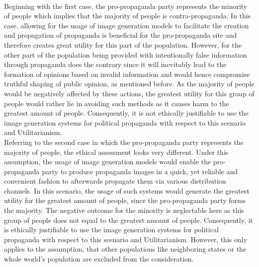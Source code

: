 \documentclass[10pt,twocolumn,twoside]{osajnl}
\begin{document}
\\
Beginning with the first case, the pro-propaganda party represents the minority of people which implies that the majority of people is contra-propaganda. In this case,
allowing for the usage of image generation models to facilitate the creation and propagation of propaganda is beneficial for the pro-propaganda site and therefore creates great utility for this part of the population.
However, for the other part of the population being provided with intentionally false information through propaganda does the contrary since it will inevitably lead to the formation of opinions based on 
invalid information and would hence compromise truthful shaping of public opinion, as mentioned before. 
As the majority of people would be negatively affected by these actions, the greatest utility for this group of people would rather lie in avoiding such methods as it causes harm to the greatest amount of people. 
Consequently, it is not ethically justifiable to use the image generation systems for political propaganda with respect to this scenario and Utilitarianism.
\\
Referring to the second case in which the pro-propaganda party represents the majority of people, the ethical assessment looks very different.
Under this assumption, the usage of image generation models would enable the pro-propaganda party to produce propaganda images in a quick, yet reliable and convenient fashion to afterwards 
propagate them via various distribution channels. In this scenario, the usage of such systems would generate the greatest utility for the greatest amount of people, since the pro-propaganda party 
forms the majority. The negative outcome for the minority is neglectable here as this group of people does not equal to the greatest amount of people. Consequently, it is ethically justifiable to use the 
image generation systems for political propaganda with respect to this scenario and Utilitarianism. 
However, this only applies to the assumption, that other populations like neighboring states or the whole world's population are excluded from the consideration. 
\end{document}
